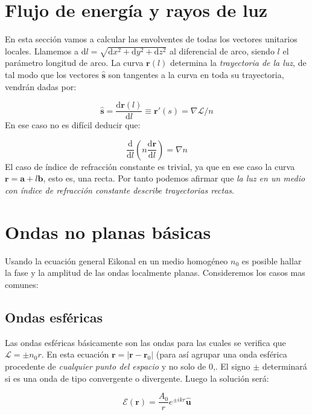 \documentclass[12pt,a4paper]{book}
\numberwithin{equation}{section}
\numberwithin{figure}{section}
\newcommand{\parentesis}[1]{\left( #1  \right)}
\newcommand{\D}{\mathrm{d}}
\newcommand{\derivadas}[2]{\frac{\D #1}{\D #2}}
\newcommand{\1}{_{(1)}}
\newcommand{\2}{_{(2)}}
\newcommand{\un}{\mathbf{u}}
\newcommand{\rn}{\mathbf{r}}
\newcommand{\sn}{\mathbf{s}}
\newcommand{\an}{\mathbf{a}}
\newcommand{\bn}{\mathbf{b}}
\newcommand{\Encal}{\boldsymbol{\mathcal{E}}}
\newcommand{\hnu}{\hat{\un}}
\newcommand{\hns}{\hat{\sn}}
\theoremstyle{definition}
\begin{document}
\section{Flujo de energía y rayos de luz}

En esta sección vamos a calcular las envolventes de todas los vectores unitarios locales. Llamemos a $\D l = \sqrt{\D x^2 + \D y^2 + \D z^2}$ al diferencial de arco, siendo $l$ el parámetro longitud de arco.  La curva $\rn (l)$ determina la \textit{trayectoria de la luz}, de tal modo que los vectores $\hns$ son tangentes a la curva en toda su trayectoria, vendrán dadas por:

\begin{equation}
\hns =  \derivadas{\rn (l)}{ l} \equiv \rn ' (s) = \nabla \mathcal{L} / n
\end{equation}
En ese caso no es difícil deducir que:

\begin{equation}
\derivadas{}{l} \parentesis{ n \derivadas{\rn}{l}} = \nabla n
\end{equation}
El caso de índice de refracción constante es trivial, ya que en ese caso la curva $\rn = \an + l \bn$, esto es, una recta. Por tanto podemos afirmar que \textit{la luz en un medio con índice de refracción constante describe trayectorias rectas}. 

\section{Ondas no planas básicas}

Usando la ecuación general Eikonal en un medio homogéneo $n_0$ es posible hallar la fase y la amplitud de las ondas localmente planas. Consideremos los casos  mas comunes:

\subsection{Ondas esféricas}

Las ondas esféricas básicamente son las ondas para las cuales se verifica que $\mathcal{L} = \pm n_0 r$. En esta ecuación $\rn = | \rn  - \rn_0|$ (para así agrupar una onda esférica procedente de \textit{cualquier punto del espacio} y no solo de 0,. El signo $\pm$ determinará si es una onda de tipo convergente o divergente. Luego la solución será:

\begin{equation}
\Encal (\rn) = \dfrac{A_0}{r} e^{ \pm i kr} \hnu
\end{equation}
\end{document}
